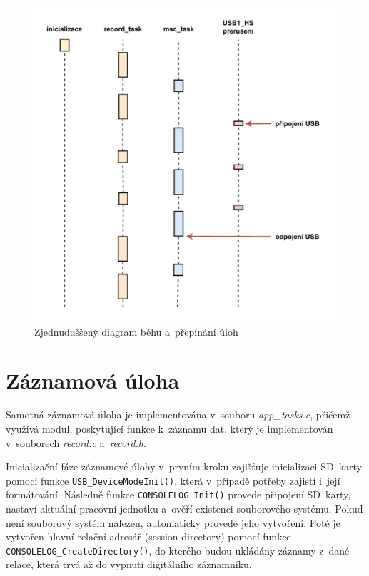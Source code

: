 \begin{figure}[h]
    \centering
    \includegraphics[width=1.00\textwidth]{obrazky-figures/run_wout_freertos-updated.pdf}
    
    \caption{Zjednuduššený diagram běhu a~přepínání úloh}
    \label{fig:application-run-freertos}
\end{figure}

\newpage

\section{Záznamová úloha}
\label{zaznamove_vlakno}
Samotná záznamová úloha je implementována v~souboru \textit{app\_tasks.c}, přičemž využívá modul, poskytující funkce k~záznamu dat, který je implementován v~souborech \textit{record.c} a~\textit{record.h}. 

Inicializační fáze záznamové úlohy v~prvním kroku zajišťuje inicializaci SD~karty pomocí funkce \texttt{USB\_DeviceModeInit()}, která v~případě potřeby zajistí i~její formátování. Následně funkce \texttt{CONSOLELOG\_Init()} provede připojení SD~karty, nastaví aktuální pracovní jednotku a~ověří existenci souborového systému. Pokud není souborový systém nalezen, automaticky provede jeho vytvoření. Poté je vytvořen hlavní relační adresář (session directory) pomocí funkce \texttt{CONSOLELOG\_CreateDirectory()}, do kterého budou ukládány záznamy z~dané relace, která trvá až do vypnutí digitálního záznamníku.

